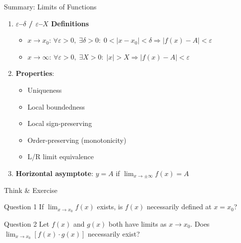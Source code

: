 \documentclass[aspectratio=169,10pt]{beamer}
\begin{document}
\begin{frame}{Summary: Limits of Functions}
  \begin{enumerate}
    \item \textbf{$\varepsilon$--$\delta$ / $\varepsilon$--$X$ Definitions}
    \begin{itemize}
      \item $x\to x_0$: $\forall\varepsilon>0,\;\exists\delta>0:\;0<|x-x_0|<\delta\Rightarrow|f(x)-A|<\varepsilon$
      \item $x\to\infty$: $\forall\varepsilon>0,\;\exists X>0:\;|x|>X\Rightarrow|f(x)-A|<\varepsilon$
    \end{itemize}
    \item \textbf{Properties}:
    \begin{itemize}
      \item Uniqueness
      \item Local boundedness
      \item Local sign-preserving
      \item Order-preserving (monotonicity)
      \item L/R limit equivalence
    \end{itemize}
    \item \textbf{Horizontal asymptote}: $y=A$ if $\lim_{x\to\pm\infty}f(x)=A$
  \end{enumerate}
\end{frame}

\begin{frame}{Think \& Exercise}
  \begin{block}{Question 1}
    If $\displaystyle\lim_{x\to x_0}f(x)$ exists, is $f(x)$ necessarily defined at $x=x_0$?
  \end{block}
  \pause
  \begin{block}{Question 2}
    Let $f(x)$ and $g(x)$ both have limits as $x\to x_0$.
    Does $\displaystyle\lim_{x\to x_0}[f(x)\cdot g(x)]$ necessarily exist?
  \end{block}
\end{frame}
\end{document}
